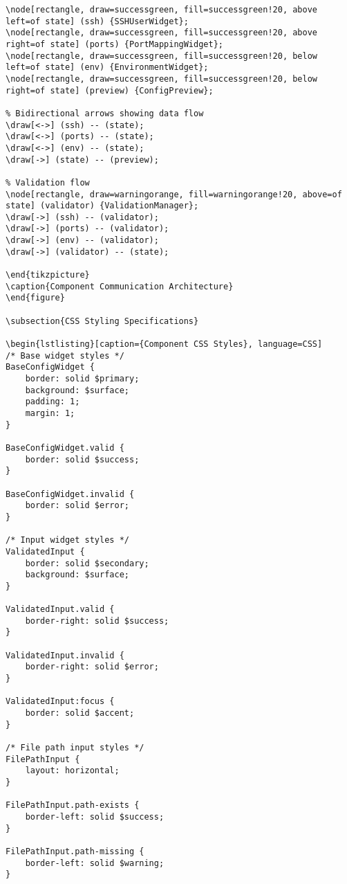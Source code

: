 \documentclass[11pt,a4paper]{article}
\begin{document}
\begin{lstlisting}[caption={ConfigPreview Implementation}]
% Component widgets around the state manager
\node[rectangle, draw=successgreen, fill=successgreen!20, above left=of state] (ssh) {SSHUserWidget};
\node[rectangle, draw=successgreen, fill=successgreen!20, above right=of state] (ports) {PortMappingWidget};
\node[rectangle, draw=successgreen, fill=successgreen!20, below left=of state] (env) {EnvironmentWidget};
\node[rectangle, draw=successgreen, fill=successgreen!20, below right=of state] (preview) {ConfigPreview};

% Bidirectional arrows showing data flow
\draw[<->] (ssh) -- (state);
\draw[<->] (ports) -- (state);  
\draw[<->] (env) -- (state);
\draw[->] (state) -- (preview);

% Validation flow
\node[rectangle, draw=warningorange, fill=warningorange!20, above=of state] (validator) {ValidationManager};
\draw[->] (ssh) -- (validator);
\draw[->] (ports) -- (validator);
\draw[->] (env) -- (validator);
\draw[->] (validator) -- (state);

\end{tikzpicture}
\caption{Component Communication Architecture}
\end{figure}

\subsection{CSS Styling Specifications}

\begin{lstlisting}[caption={Component CSS Styles}, language=CSS]
/* Base widget styles */
BaseConfigWidget {
    border: solid $primary;
    background: $surface;
    padding: 1;
    margin: 1;
}

BaseConfigWidget.valid {
    border: solid $success;
}

BaseConfigWidget.invalid {
    border: solid $error;
}

/* Input widget styles */
ValidatedInput {
    border: solid $secondary;
    background: $surface;
}

ValidatedInput.valid {
    border-right: solid $success;
}

ValidatedInput.invalid {
    border-right: solid $error;
}

ValidatedInput:focus {
    border: solid $accent;
}

/* File path input styles */
FilePathInput {
    layout: horizontal;
}

FilePathInput.path-exists {
    border-left: solid $success;
}

FilePathInput.path-missing {
    border-left: solid $warning;
}


\end{lstlisting}
\end{document}
